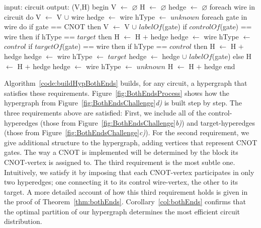 \begin{algorithm}[caption={Builds the hypergraph of a given circuit, without choosing whether non-local CNOTs are implemented using the remote-control or the remote-target method. This algorithm runs in time \(O(g)\), where \(g\) is the number of gates in the input circuit.}, label={code:buildHypBothEnds}]
input: circuit
output: (V,H)
begin
  V $\gets$ $\varnothing$
  H $\gets$ $\varnothing$
  hedge $\gets$ $\varnothing$
  foreach wire in circuit do
    V $\gets$ V $\cup$ {wire}
    hedge $\gets$ {wire}
    hType $\gets$ $unknown$
    foreach gate in wire do
      if gate == CNOT then
        V $\gets$ V $\cup$ {$labelOf$(gate)}
        if $controlOf$(gate) == wire then
          if hType == $target$ then
            H $\gets$ H $+$ {hedge}
            hedge $\gets$ {wire}
          hType $\gets$ $control$
        if $targetOf$(gate) == wire then
          if hType == $control$ then
            H $\gets$ H $+$ {hedge}
            hedge $\gets$ {wire}  
          hType $\gets$ $target$
        hedge $\gets$ hedge $\cup$ {$labelOf$(gate)}
      else
        H $\gets$ H $+$ {hedge}
        hedge $\gets$ {wire}
        hType $\gets$ $unknown$
    H $\gets$ H $+$ {hedge}
end
\end{algorithm}



Algorithm~\ref{code:buildHypBothEnds} builds, for any circuit, a hypergraph that satisfies these requirements. Figure~\ref{fig:BothEndsProcess} shows how the hypergraph from Figure~\ref{fig:BothEndsChallenge}\textit{d)} is built step by step. The three requirements above are satisfied: First, we include all of the control-hyperedges (those from Figure~\ref{fig:BothEndsChallenge}\textit{b)}) and target-hyperedges (those from Figure~\ref{fig:BothEndsChallenge}\textit{c)}). For the second requirement, we give additional structure to the hypergraph, adding vertices that represent CNOT gates. The way a CNOT is implemented will be determined by the block its CNOT-vertex is assigned to. The third requirement is the most subtle one. Intuitively, we satisfy it by imposing that each CNOT-vertex participates in only two hyperedges; one connecting it to its control wire-vertex, the other to its target. A more detailed account of how this third requirement holds is given in the proof of Theorem~\ref{thm:bothEnds}. Corollary~\ref{col:bothEnds} confirms that the optimal partition of our hypergraph determines the most efficient circuit distribution.


